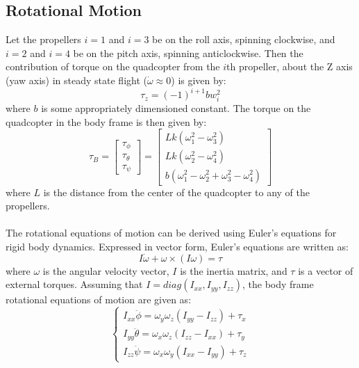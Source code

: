 \documentclass{article}
\begin{document}
\subsection{Rotational Motion}
Let the propellers $i=1$ and $i=3$ be on the roll axis, spinning clockwise, and $i=2$ and $i=4$ be on the pitch axis, spinning anticlockwise. Then the contribution of torque on the quadcopter from the $i$th propeller, about the Z axis (yaw axis) in steady state flight ($\dot{\omega}\approx0$) is given by:
\begin{equation}
\tau_z = (-1)^{i+1}bw_i^2
\end{equation}
where $b$ is some appropriately dimensioned constant. The torque on the quadcopter in the body frame is then given by:
\begin{equation}
\label{torque}
\tau_B 	= \begin{bmatrix} \tau_{\phi} \\ \tau_{\theta} \\ \tau_{\psi} \end{bmatrix}
		= \begin{bmatrix} Lk(\omega_1^2 - \omega_3^2) \\ Lk(\omega_2^2-\omega_4^2) \\ b(\omega_1^2-\omega_2^2+\omega_3^2-				\omega_4^2) \end{bmatrix}
\end{equation}
where $L$ is the distance from the center of the quadcopter to any of the propellers. \\\\
The rotational equations of motion can be derived using Euler's equations for rigid body dynamics. Expressed in vector form, Euler's equations are written as:
\begin{equation}
I\dot{\omega}+\omega\times(I\omega) = \tau
\end{equation}
where $\omega$ is the angular velocity vector, $I$ is the inertia matrix, and $\tau$ is a vector of external torques. Assuming that $I = diag(I_{xx}, I_{yy}, I_{zz})$, the body frame rotational equations of motion are given as:
\begin{equation}
\label{rotation}
\left\{
\begin{array}{rl}
I_{xx}\ddot{\phi}=\omega_y \omega_z(I_{yy}-I_{zz})+\tau_x\\
I_{yy}\ddot{\theta}=\omega_x \omega_z(I_{zz}-I_{xx})+\tau_y\\
I_{zz}\ddot{\psi}=\omega_x \omega_y(I_{xx}-I_{yy})+\tau_z
\end{array}
\right.
\end{equation} 
\end{document}
